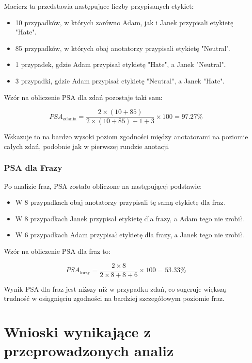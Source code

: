 \documentclass[12pt]{article}
\begin{document}
Macierz ta przedstawia następujące liczby przypisanych etykiet:
\begin{itemize}
    \item 10 przypadków, w których zarówno Adam, jak i Janek przypisali etykietę "Hate".
    \item 85 przypadków, w których obaj anotatorzy przypisali etykietę "Neutral".
    \item 1 przypadek, gdzie Adam przypisał etykietę "Hate", a Janek "Neutral".
    \item 3 przypadki, gdzie Adam przypisał etykietę "Neutral", a Janek "Hate".
\end{itemize}

Wzór na obliczenie PSA dla zdań pozostaje taki sam:

\begin{dmath}
PSA_{\text{zdania}} = \frac{2 \times (10 + 85)}{2 \times (10 + 85) + 1 + 3} \times 100 = 97.27\%
\end{dmath}

Wskazuje to na bardzo wysoki poziom zgodności między anotatorami na poziomie całych zdań, podobnie jak w pierwszej rundzie anotacji.

\subsubsection{PSA dla Frazy}

Po analizie fraz, PSA zostało obliczone na następującej podstawie:
\begin{itemize}
    \item W 8 przypadkach obaj anotatorzy przypisali tę samą etykietę dla fraz.
    \item W 8 przypadkach Janek przypisał etykietę dla frazy, a Adam tego nie zrobił.
    \item W 6 przypadkach Adam przypisał etykietę dla frazy, a Janek tego nie zrobił.
\end{itemize}

Wzór na obliczenie PSA dla fraz to:

\begin{dmath}
PSA_{\text{frazy}} = \frac{2 \times 8}{2 \times 8 + 8 + 6} \times 100 = 53.33\%
\end{dmath}

Wynik PSA dla fraz jest niższy niż w przypadku zdań, co sugeruje większą trudność w osiągnięciu zgodności na bardziej szczegółowym poziomie fraz.

\section{Wnioski wynikające z przeprowadzonych analiz}
\end{document}
